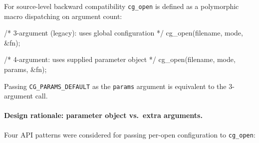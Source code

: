 \documentclass[11pt,letterpaper]{article}
\makeatletter
\let\cgns@orig@lstlisting\lstlisting
\let\cgns@endorig@lstlisting\endlstlisting
\renewenvironment{lstlisting}
  {\par\needspace{5\baselineskip}\nolinenumbers\cgns@orig@lstlisting}
  {\cgns@endorig@lstlisting\par\linenumbers}
\makeatother
\begin{document}
For source-level backward compatibility \texttt{cg\_open} is defined
as a polymorphic macro dispatching on argument count:

\begin{lstlisting}[language=C]
/* 3-argument (legacy): uses global configuration */
cg_open(filename, mode, &fn);

/* 4-argument: uses supplied parameter object */
cg_open(filename, mode, params, &fn);
\end{lstlisting}

Passing \texttt{CG\_PARAMS\_DEFAULT} as the \texttt{params} argument
is equivalent to the 3-argument call.

\paragraph{Design rationale: parameter object vs.\ extra arguments.}
Four API patterns were considered for passing per-open configuration
to \texttt{cg\_open}:
\end{document}
